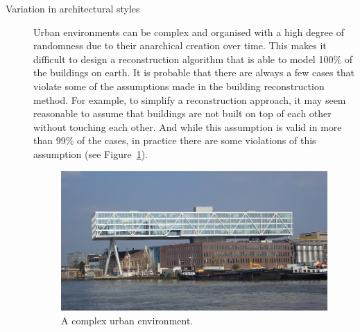 \begin{description}
	\item[Variation in architectural styles] Urban environments can be complex and organised with a high degree of randomness due to their anarchical creation over time. This makes it difficult to design a reconstruction algorithm that is able to model 100\% of the buildings on earth. It is probable that there are always a few cases that violate some of the assumptions made in the building reconstruction method. For example, to simplify a reconstruction approach, it may seem reasonable to assume that buildings are not built on top of each other without touching each other. And while this assumption is valid in more than 99\% of the cases, in practice there are some violations of this assumption (see Figure~\ref{fig:debrug}).
	\begin{figure}
		\centering
		\includegraphics[width=0.8\linewidth]{figs/de_brug.jpg}
		\caption{A complex urban environment.}%
		\label{fig:debrug}
	\end{figure}
	

\end{description}
